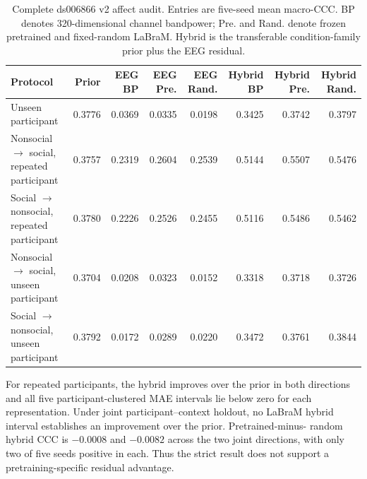 \begin{table}[t]
  \caption{Complete ds006866 v2 affect audit. Entries are five-seed mean
  macro-CCC. BP denotes 320-dimensional channel bandpower; Pre. and Rand.
  denote frozen pretrained and fixed-random LaBraM. Hybrid is the transferable
  condition-family prior plus the EEG residual.}
  \label{tab:ds006866-v2-affect}
  \centering
  \scriptsize
  \setlength{\tabcolsep}{3.2pt}
  \begin{tabularx}{\textwidth}{@{}Xrrrrrrr@{}}
    \toprule
    Protocol & Prior & EEG BP & EEG Pre. & EEG Rand. & Hybrid BP & Hybrid Pre. & Hybrid Rand. \\
    \midrule
    Unseen participant & 0.3776 & 0.0369 & 0.0335 & 0.0198 & 0.3425 & 0.3742 & 0.3797 \\
    Nonsocial $\rightarrow$ social, repeated participant & 0.3757 & 0.2319 & 0.2604 & 0.2539 & 0.5144 & 0.5507 & 0.5476 \\
    Social $\rightarrow$ nonsocial, repeated participant & 0.3780 & 0.2226 & 0.2526 & 0.2455 & 0.5116 & 0.5486 & 0.5462 \\
    Nonsocial $\rightarrow$ social, unseen participant & 0.3704 & 0.0208 & 0.0323 & 0.0152 & 0.3318 & 0.3718 & 0.3726 \\
    Social $\rightarrow$ nonsocial, unseen participant & 0.3792 & 0.0172 & 0.0289 & 0.0220 & 0.3472 & 0.3761 & 0.3844 \\
    \bottomrule
  \end{tabularx}
\end{table}

For repeated participants, the hybrid improves over the prior in both
directions and all five participant-clustered MAE intervals lie below zero for
each representation. Under joint participant--context holdout, no LaBraM
hybrid interval establishes an improvement over the prior. Pretrained-minus-
random hybrid CCC is $-0.0008$ and $-0.0082$ across the two joint directions,
with only two of five seeds positive in each. Thus the strict result does not
support a pretraining-specific residual advantage.

